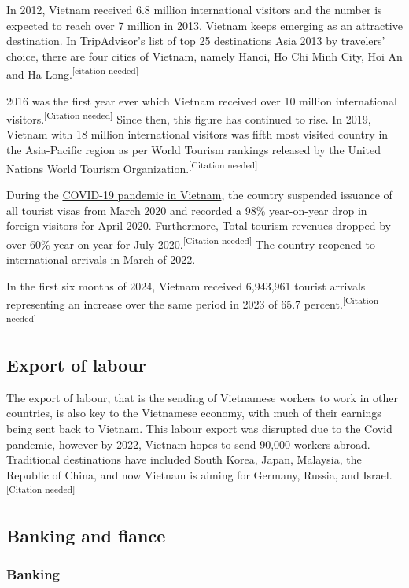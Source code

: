 \documentclass{article}
\begin{document}
In 2012, Vietnam received 6.8 million international visitors and the number is expected to reach over 7 million in 2013. Vietnam keeps emerging as an attractive destination. In TripAdvisor's list of top 25 destinations Asia 2013 by travelers' choice, there are four cities of Vietnam, namely Hanoi, Ho Chi Minh City, Hoi An and Ha Long.\textsuperscript{[citation needed]}

2016 was the first year ever which Vietnam received over 10 million international visitors.\textsuperscript{[Citation needed]} Since then, this figure has continued to rise. In 2019, Vietnam with 18 million international visitors was fifth most visited country in the Asia-Pacific region as per World Tourism rankings released by the United Nations World Tourism Organization.\textsuperscript{[Citation needed]}

During the \href{https://en.wikipedia.org/wiki/COVID-19_pandemic_in_Vietnam}{COVID-19 pandemic in Vietnam}, the country suspended issuance of all tourist visas from March 2020 and recorded a 98\% year-on-year drop in foreign visitors for April 2020. Furthermore, Total tourism revenues dropped by over 60\% year-on-year for July 2020.\textsuperscript{[Citation needed]} The country reopened to international arrivals in March of 2022.

In the first six months of 2024, Vietnam received 6,943,961 tourist arrivals representing an increase over the same period in 2023 of 65.7 percent.\textsuperscript{[Citation needed]}

\subsection*{Export of labour}
The export of labour, that is the sending of Vietnamese workers to work in other countries, is also key to the Vietnamese economy, with much of their earnings being sent back to Vietnam. This labour export was disrupted due to the Covid pandemic, however by 2022, Vietnam hopes to send 90,000 workers abroad. Traditional destinations have included South Korea, Japan, Malaysia, the Republic of China, and now Vietnam is aiming for Germany, Russia, and Israel.\textsuperscript{[Citation needed]}
\clearpage
\subsection*{Banking and fiance}
\subsubsection*{Banking}
\end{document}
